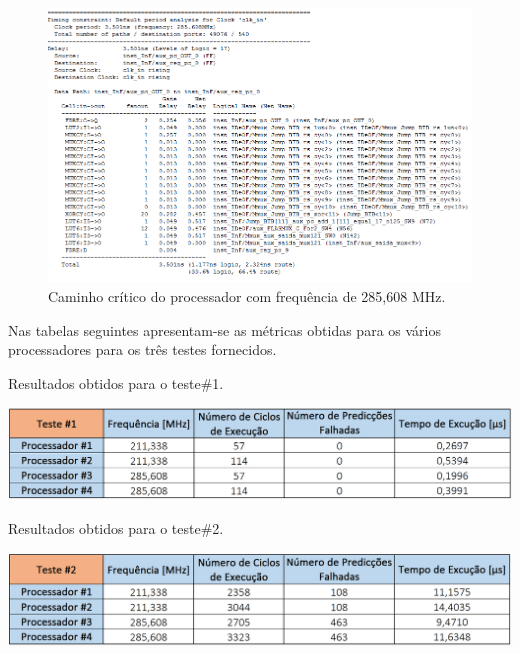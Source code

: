 \documentclass[11pt]{article}
\numberwithin{equation}{section}
\begin{document}
\begin{figure}[H]
	\centering
	\includegraphics[keepaspectratio=true, scale=0.35]{imagens/freq285}
	\vspace{-0.5em}
	\caption{Caminho crítico do processador com frequência de 285,608 MHz.}
	\label{fig:285}
	\vspace{-0.8em}
\end{figure} 

Nas tabelas seguintes apresentam-se as métricas obtidas para os vários processadores para os três testes fornecidos.

\begin{table}[H]
	\centering
	\caption{Resultados obtidos para o teste$\#$1.}
	\vspace{-1.5mm}
	\includegraphics[keepaspectratio=true, scale=0.40]{tabelas/teste1}
	\label{tab:teste1}
\end{table}

\begin{table}[H]
	\centering
	\caption{Resultados obtidos para o teste$\#$2.}
	\vspace{-1.5mm}
	\includegraphics[keepaspectratio=true, scale=0.40]{tabelas/teste2}
	\label{tab:teste2}
\end{table}
\end{document}
